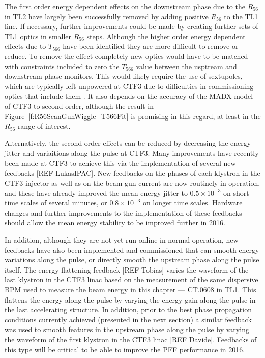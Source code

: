 The first order energy dependent effects on the downstream phase due to the \(R_{56}\) in TL2 have largely been successfully removed by adding positive \(R_{56}\) to the TL1 line. If necessary, further improvements could be made by creating further sets of TL1 optics in smaller \(R_{56}\) steps. Although the higher order energy dependent effects due to \(T_{566}\) have been identified they are more difficult to remove or reduce. To remove the effect completely new optics would have to be matched with constraints included to zero the \(T_{566}\) value between the usptream and downstream phase monitors. This would likely require the use of sextupoles, which are typically left unpowered at CTF3 due to difficulties in commissioning optics that include them \cite{piotrPriv}. It also depends on the accuracy of the MADX model of CTF3 to second order, although the result in Figure~\ref{f:R56ScanGunWiggle_T566Fit} is promising in this regard, at least in the \(R_{56}\) range of interest.

Alternatively, the second order effects can be reduced by decreasing the energy jitter and variaitions along the pulse at CTF3. Many improvements have recently been made at CTF3 to achieve this via the implementation of several new feedbacks [REF LukasIPAC]. New feedbacks on the phases of each klystron in the CTF3 injector as well as on the beam gun current are now routinely in operation, and these have already improved the mean energy jitter to \(0.5\times10^{-3}\) on short time scales of several minutes, or \(0.8\times10^{-3}\) on longer time scales. Hardware changes and further improvements to the implementation of these feedbacks should allow the mean energy stability to be improved further in 2016.

In addition, although they are not yet run online in normal operation, new feedbacks have also been implemented and commissioned that can smooth energy variations along the pulse, or directly smooth the upstream phase along the pulse itself. The energy flattening feedback [REF Tobias] varies the waveform of the last klystron in the CTF3 linac based on the measurement of the same dispersive BPM used to measure the beam energy in this chapter --- CT.0608 in TL1. This flattens the energy along the pulse by varying the energy gain along the pulse in the last accelerating structure. In addition, prior to the best phase propagation conditions currently achieved (presented in the next section) a similar feedback was used to smooth features in the upstream phase along the pulse by varying the waveform of the first klystron in the CTF3 linac [REF Davide]. Feedbacks of this type will be critical to be able to improve the PFF performance in 2016.

